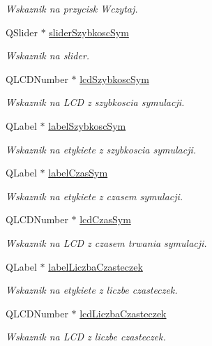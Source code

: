 \begin{DoxyCompactItemize}
\begin{DoxyCompactList}\small\item\em Wskaznik na przycisk Wczytaj. \end{DoxyCompactList}\item 
Q\-Slider $\ast$ \hyperlink{class_okno_glowne_a85328893065393400d5a0344004ca78b}{slider\-Szybkosc\-Sym}
\begin{DoxyCompactList}\small\item\em Wskaznik na slider. \end{DoxyCompactList}\item 
Q\-L\-C\-D\-Number $\ast$ \hyperlink{class_okno_glowne_ab100c00d4ba33d896fd0985ac366296a}{lcd\-Szybkosc\-Sym}
\begin{DoxyCompactList}\small\item\em Wskaznik na L\-C\-D z szybkoscia symulacji. \end{DoxyCompactList}\item 
Q\-Label $\ast$ \hyperlink{class_okno_glowne_ad7b0708ffdf61f3bef1349cc353a6c4e}{label\-Szybkosc\-Sym}
\begin{DoxyCompactList}\small\item\em Wskaznik na etykiete z szybkoscia symulacji. \end{DoxyCompactList}\item 
Q\-Label $\ast$ \hyperlink{class_okno_glowne_aca07e1dc5cbe30d6952f9b952073bb79}{label\-Czas\-Sym}
\begin{DoxyCompactList}\small\item\em Wskaznik na etykiete z czasem symulacji. \end{DoxyCompactList}\item 
Q\-L\-C\-D\-Number $\ast$ \hyperlink{class_okno_glowne_ab34fefe738e38b1b0d4ce764481cc0c6}{lcd\-Czas\-Sym}
\begin{DoxyCompactList}\small\item\em Wskaznik na L\-C\-D z czasem trwania symulacji. \end{DoxyCompactList}\item 
Q\-Label $\ast$ \hyperlink{class_okno_glowne_ab01460f1222d0ec2892abf21efb23078}{label\-Liczba\-Czasteczek}
\begin{DoxyCompactList}\small\item\em Wskaznik na etykiete z liczbe czasteczek. \end{DoxyCompactList}\item 
Q\-L\-C\-D\-Number $\ast$ \hyperlink{class_okno_glowne_adbdd9fc009725804e015d267dc8375dc}{lcd\-Liczba\-Czasteczek}
\begin{DoxyCompactList}\small\item\em Wskaznik na L\-C\-D z liczbe czasteczek. \end{DoxyCompactList}\item 

\end{DoxyCompactItemize}
